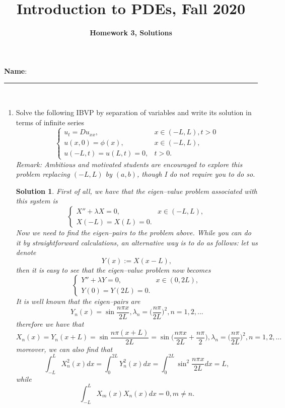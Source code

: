 \documentclass[6pt]{article}
\title{Introduction to PDEs, Fall 2020}
\author{\textbf{Homework 3, Solutions}}
\date{}
\newtheorem{solution}{Solution}
\numberwithin{equation}{section}
\begin{document}
\maketitle

\textbf{Name}:\rule{1 in}{0.001 in} \\
\begin{enumerate}
\item Solve the following IBVP by separation of variables and write its solution in terms of infinite series
\begin{equation}
\left\{
\begin{array}{ll}
u_t=Du_{xx},& x\in(-L,L),t>0\\
u(x,0)=\phi(x),&x\in(-L,L),\\
u(-L,t)=u(L,t)=0, &t>0.
\end{array}
\right.
\end{equation}
\emph{Remark:  Ambitious and motivated students are encouraged to explore this problem replacing $(-L,L)$ by $(a,b)$, though I do not require you to do so.}
\begin{solution}
First of all, we have that the eigen--value problem associated with this system is
\begin{equation*}
\left\{
\begin{array}{ll}
X''+\lambda X=0,& x\in(-L,L),\\
X(-L)=X(L)=0. &
\end{array}
\right.
\end{equation*}
Now we need to find the eigen--pairs to the problem above.  While you can do it by straightforward calculations, an alternative way is to do as follows:
let us denote 
\[Y(x):=X(x-L),\]
then it is easy to see that the eigen--value problem now becomes
\begin{equation*}
\left\{
\begin{array}{ll}
Y''+\lambda Y=0,& x\in(0,2L),\\
Y(0)=Y(2L)=0. &
\end{array}
\right.
\end{equation*}
It is well known that the eigen--pairs are
\[\]
\[Y_n(x)=\sin \frac{n\pi x}{2L},\lambda_n=\Big(\frac{n\pi}{2L}\Big)^2,n=1,2,...\]
therefore we have that
\[X_n(x)=Y_n(x+L)=\sin \frac{n\pi (x+L)}{2L}=\sin \Big(\frac{n\pi x}{2L}+\frac{n\pi}{2}\Big),\lambda_n=\Big(\frac{n\pi}{2L}\Big)^2,n=1,2,...\]
moreover, we can also find that
\[\int_{-L}^L X^2_n(x)dx=\int_0^{2L}Y^2_n(x)dx=\int_0^{2L}\sin^2 \frac{n\pi x}{2L}dx=L,\]
while \[\int_{-L}^L X_m(x)X_n(x)dx=0,m\neq n.\]


\end{solution}
\end{enumerate}
\end{document}
